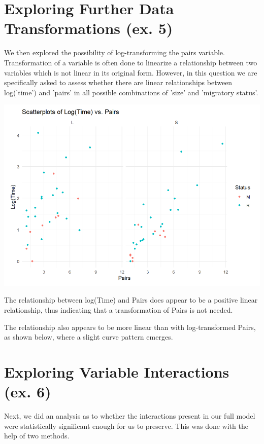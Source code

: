 \documentclass{article}
\begin{document}
\section{Exploring Further Data Transformations (ex. 5)}
We then explored the possibility of log-transforming the pairs variable. Transformation of a variable is often done to linearize a relationship between two variables which is not linear in its original form. However, in this question we are specifically asked to assess whether there are linear relationships between log('time') and 'pairs' in all possible combinations of 'size' and 'migratory status'.

\begin{center}
\includegraphics[scale=0.5]{graphs/graph5.png}
\end{center}

The relationship between log(Time) and Pairs does appear to be a positive linear relationship, thus indicating that a transformation of Pairs is not needed.

The relationship also appears to be more linear than with log-transformed Pairs, as shown below, where a slight curve pattern emerges.



\section{Exploring Variable Interactions (ex. 6)}

Next, we did an analysis as to whether the interactions present in our full model were statistically significant enough for us to preserve. This was done with the help of two methods.
\end{document}

